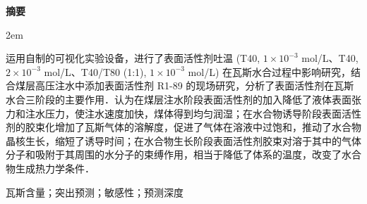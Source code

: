 \begingroup
    \vspace{\baselineskip} 
    \centering
    \heiti\bfseries 摘\quad\quad 要 
    \par
    \vspace{\baselineskip}
\endgroup

\begingroup
    \songti
    \setlength{\baselineskip}{25pt}
    \parindent 2em
    
    运用自制的可视化实验设备，进行了表面活性剂吐温 (T40, $1 \times 10^{-3}$ mol/L、T40, $2 \times 10^{-3}$ mol/L、T40/T80 (1:1), $1 \times 10^{-3}$ mol/L) 在瓦斯水合过程中影响研究，结合煤层高压注水中添加表面活性剂 R1-89 的现场研究，分析了表面活性剂在瓦斯水合三阶段的主要作用．认为在煤层注水阶段表面活性剂的加入降低了液体表面张力和注水压力，使注水速度加快，煤体得到均匀润湿；在水合物诱导阶段表面活性剂的胶束化增加了瓦斯气体的溶解度，促进了气体在溶液中过饱和，推动了水合物晶核生长，缩短了诱导时间；在水合物生长阶段表面活性剂胶束对溶于其中的气体分子和吸附于其周围的水分子的束缚作用，相当于降低了体系的温度，改变了水合物生成热力学条件．
    \par
\endgroup

\vspace{2\baselineskip}

\begingroup
    \noindent 
    \songti 瓦斯含量；突出预测；敏感性；预测深度
\endgroup
\clearpage